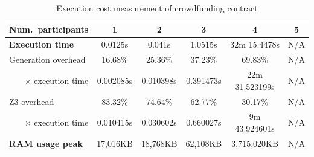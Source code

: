 \documentclass[english,runningheads]{llncs}
\begin{document}
\begin{table}[]
{\begin{tabular}{l||lllll}
\textbf{Num.~participants}             & \multicolumn{1}{c|}{1}         & \multicolumn{1}{c|}{2}         & \multicolumn{1}{c|}{3}         & \multicolumn{1}{c|}{4}              & \multicolumn{1}{c}{5}    \\ \hline
\textbf{Execution time}                & \multicolumn{1}{c|}{0.0125s}   & \multicolumn{1}{c|}{0.041s}    & \multicolumn{1}{c|}{1.0515s}   & \multicolumn{1}{c|}{32m 15.4478s}   & \multicolumn{1}{c}{\color[HTML]{888888} N/A} \\ \hline
Generation overhead                    & \multicolumn{1}{c|}{16.68\%}   & \multicolumn{1}{c|}{25.36\%}   & \multicolumn{1}{c|}{37.23\%}   & \multicolumn{1}{c|}{69.83\%}        & \multicolumn{1}{c}{\color[HTML]{888888} N/A} \\ \hline
\multicolumn{1}{r||}{× execution time} & \multicolumn{1}{c|}{0.002085s} & \multicolumn{1}{c|}{0.010398s} & \multicolumn{1}{c|}{0.391473s} & \multicolumn{1}{c|}{22m 31.523199s} & \multicolumn{1}{c}{\color[HTML]{888888} N/A} \\ \hline
Z3 overhead                            & \multicolumn{1}{c|}{83.32\%}   & \multicolumn{1}{c|}{74.64\%}   & \multicolumn{1}{c|}{62.77\%}   & \multicolumn{1}{c|}{30.17\%}        & \multicolumn{1}{c}{\color[HTML]{888888} N/A} \\ \hline
\multicolumn{1}{r||}{× execution time} & \multicolumn{1}{c|}{0.010415s} & \multicolumn{1}{c|}{0.030602s} & \multicolumn{1}{c|}{0.660027s} & \multicolumn{1}{c|}{9m 43.924601s}  & \multicolumn{1}{c}{\color[HTML]{888888} N/A} \\ \hline
\textbf{RAM usage peak}                & \multicolumn{1}{c|}{17,016KB}  & \multicolumn{1}{c|}{18,768KB}  & \multicolumn{1}{c|}{62,108KB}  & \multicolumn{1}{c|}{3,715,020KB}    & \multicolumn{1}{c}{\color[HTML]{888888} N/A}
\end{tabular}
}
\caption{Execution cost measurement of crowdfunding contract\label{table2}}
\end{table}
\end{document}

